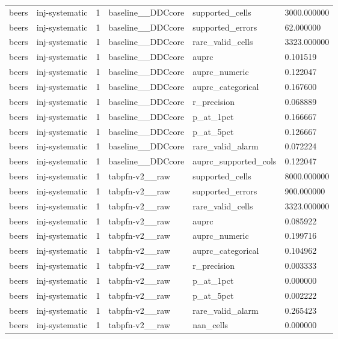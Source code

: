 \begin{tabular}{llllll}
beers & inj-systematic & 1 & baseline\_\_DDCcore & supported\_cells & 3000.000000 \\
beers & inj-systematic & 1 & baseline\_\_DDCcore & supported\_errors & 62.000000 \\
beers & inj-systematic & 1 & baseline\_\_DDCcore & rare\_valid\_cells & 3323.000000 \\
beers & inj-systematic & 1 & baseline\_\_DDCcore & auprc & 0.101519 \\
beers & inj-systematic & 1 & baseline\_\_DDCcore & auprc\_numeric & 0.122047 \\
beers & inj-systematic & 1 & baseline\_\_DDCcore & auprc\_categorical & 0.167600 \\
beers & inj-systematic & 1 & baseline\_\_DDCcore & r\_precision & 0.068889 \\
beers & inj-systematic & 1 & baseline\_\_DDCcore & p\_at\_1pct & 0.166667 \\
beers & inj-systematic & 1 & baseline\_\_DDCcore & p\_at\_5pct & 0.126667 \\
beers & inj-systematic & 1 & baseline\_\_DDCcore & rare\_valid\_alarm & 0.072224 \\
beers & inj-systematic & 1 & baseline\_\_DDCcore & auprc\_supported\_cols & 0.122047 \\
beers & inj-systematic & 1 & tabpfn-v2\_\_raw & supported\_cells & 8000.000000 \\
beers & inj-systematic & 1 & tabpfn-v2\_\_raw & supported\_errors & 900.000000 \\
beers & inj-systematic & 1 & tabpfn-v2\_\_raw & rare\_valid\_cells & 3323.000000 \\
beers & inj-systematic & 1 & tabpfn-v2\_\_raw & auprc & 0.085922 \\
beers & inj-systematic & 1 & tabpfn-v2\_\_raw & auprc\_numeric & 0.199716 \\
beers & inj-systematic & 1 & tabpfn-v2\_\_raw & auprc\_categorical & 0.104962 \\
beers & inj-systematic & 1 & tabpfn-v2\_\_raw & r\_precision & 0.003333 \\
beers & inj-systematic & 1 & tabpfn-v2\_\_raw & p\_at\_1pct & 0.000000 \\
beers & inj-systematic & 1 & tabpfn-v2\_\_raw & p\_at\_5pct & 0.002222 \\
beers & inj-systematic & 1 & tabpfn-v2\_\_raw & rare\_valid\_alarm & 0.265423 \\
beers & inj-systematic & 1 & tabpfn-v2\_\_raw & nan\_cells & 0.000000 \\

\end{tabular}
